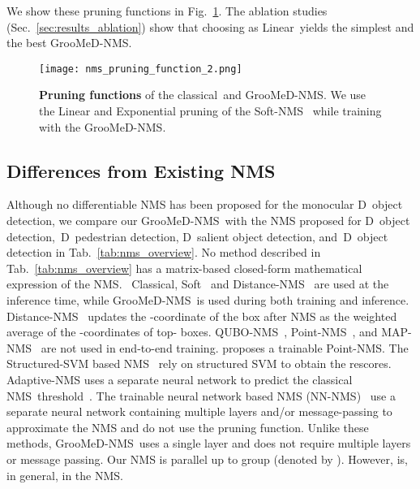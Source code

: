 \documentclass[final]{cvpr}
\newcommand{\myReferTable}[1]{Tab.~\ref{#1}}
\newcommand{\myReferFigure}[1]{Fig.~\ref{#1}}
\newcommand{\myReferSection}[1]{Sec.~\ref{#1}}
\newcommand{\methodName}{GrooMeD-NMS}
\newcommand{\twoD}{D}
\newcommand{\threeD}{D}
\newcommand{\basic}{Linear}
\newcommand{\classicalNmsShort}{classical}
\newcommand{\classicalNmsShortCaps}{Classical}
\newcommand{\classicalNms}{classical NMS}
\newcommand{\softNmsCaps}{Soft-NMS}
\newcommand{\softNmsShortCaps}{Soft}
\newcommand{\distanceNmsCaps}{Distance-NMS}
\begin{document}
            We show these pruning functions in \myReferFigure{fig:pruning}. 
            The ablation studies (\myReferSection{sec:results_ablation}) show that choosing  as \basic~yields the simplest and the best \methodName.
            \begin{figure}[!tb]
                \centering
                \texttt{[image: nms\_pruning\_function\_2.png]}
                \vspace{1mm}
                \caption{\textbf{Pruning functions}  of the \classicalNmsShort~and \methodName. We use the Linear and Exponential pruning of the \softNmsCaps~\cite{bodla2017soft} while training with the \methodName.}
                \label{fig:pruning}
            \end{figure}


\subsection{Differences from Existing NMS}\label{sec:difference}

        Although no differentiable NMS has been proposed for the monocular \threeD~object detection, we compare our \methodName~with the NMS proposed for \twoD~object detection,~\twoD~pedestrian detection, \twoD~salient object detection, and~\threeD~object detection in \myReferTable{tab:nms_overview}.
        No method described in \myReferTable{tab:nms_overview} has a matrix-based closed-form mathematical expression of the NMS.
        ~\classicalNmsShortCaps, \softNmsShortCaps~\cite{bodla2017soft} and \distanceNmsCaps~\cite{shi2020distance} are used at the inference time, while \methodName~is used during both training and inference.
        \distanceNmsCaps~\cite{shi2020distance} updates the -coordinate of the box after NMS as the weighted average of the -coordinates of top- boxes.
        QUBO-NMS~\cite{rujikietgumjorn2013optimized}, Point-NMS~\cite{lee2016individualness, some2020determinantal}, and MAP-NMS~\cite{zhang2016unconstrained} are not used in end-to-end training.
        \cite{azadi2017learning} proposes a trainable Point-NMS.
        The Structured-SVM based NMS~\cite{desai2011discriminative, wan2015end} rely on structured SVM to obtain the rescores. 
        Adaptive-NMS\cite{liu2019adaptive} uses a separate neural network to predict the \classicalNms~threshold~.
        The trainable neural network based NMS (NN-NMS)~\cite{hosang2016convnet, prokudin2017learning, hosang2017learning} use a separate neural network containing multiple layers and/or message-passing to approximate the NMS and do not use the pruning function.
        Unlike these methods, \methodName~uses a single layer and does not require multiple layers or message passing. Our NMS is parallel up to group (denoted by ). 
        However,  is, in general,  in the NMS. 
\end{document}
